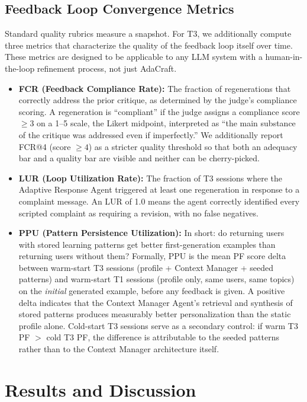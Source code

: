 \documentclass[conference]{IEEEtran}
\begin{document}
\subsection{Feedback Loop Convergence Metrics}

Standard quality rubrics measure a snapshot. For T3, we additionally compute three metrics that characterize the quality of the feedback loop itself over time. These metrics are designed to be applicable to any LLM system with a human-in-the-loop refinement process, not just AdaCraft.

\begin{itemize}
    \item \textbf{FCR (Feedback Compliance Rate):} The fraction of regenerations that correctly address the prior critique, as determined by the judge's compliance scoring. A regeneration is ``compliant'' if the judge assigns a compliance score $\geq 3$ on a 1--5 scale, the Likert midpoint, interpreted as ``the main substance of the critique was addressed even if imperfectly.'' We additionally report FCR@4 (score $\geq 4$) as a stricter quality threshold so that both an adequacy bar and a quality bar are visible and neither can be cherry-picked.
    \item \textbf{LUR (Loop Utilization Rate):} The fraction of T3 sessions where the Adaptive Response Agent triggered at least one regeneration in response to a complaint message. An LUR of 1.0 means the agent correctly identified every scripted complaint as requiring a revision, with no false negatives.
    \item \textbf{PPU (Pattern Persistence Utilization):} In short: do returning users with stored learning patterns get better first-generation examples than returning users without them? Formally, PPU is the mean PF score delta between warm-start T3 sessions (profile + Context Manager + seeded patterns) and warm-start T1 sessions (profile only, same users, same topics) on the \textit{initial} generated example, before any feedback is given. A positive delta indicates that the Context Manager Agent's retrieval and synthesis of stored patterns produces measurably better personalization than the static profile alone. Cold-start T3 sessions serve as a secondary control: if warm T3 PF $>$ cold T3 PF, the difference is attributable to the seeded patterns rather than to the Context Manager architecture itself.
\end{itemize}

\section{Results and Discussion}
\label{sec:results}
\end{document}
